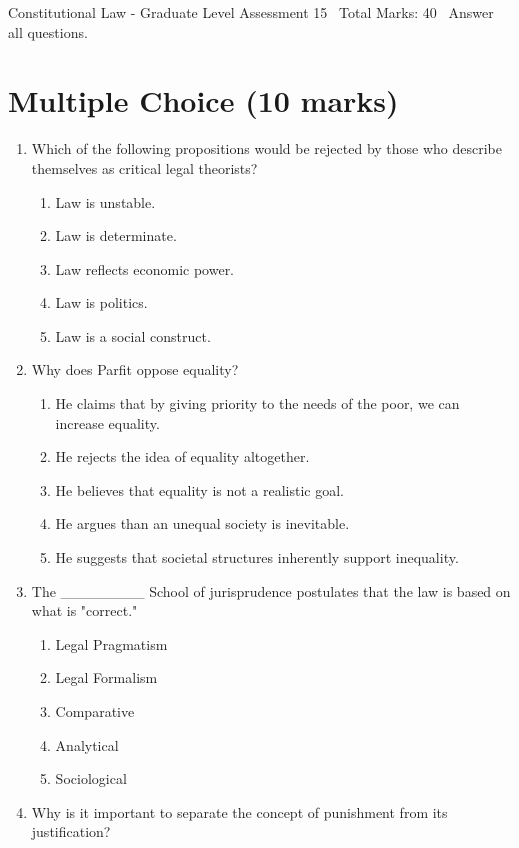 \documentclass[12pt]{article}
\begin{document}
\begin{center}
Constitutional Law - Graduate Level Assessment 15 \
Total Marks: 40 \
Answer all questions.
\end{center}

\section*{Multiple Choice (10 marks)}
\begin{enumerate}[label=\arabic*.]
\item Which of the following propositions would be rejected by those who describe themselves as critical legal theorists?
\begin{enumerate}[label=(\alph*)]
    \item Law is unstable.
    \item Law is determinate.
    \item Law reflects economic power.
    \item Law is politics.
    \item Law is a social construct.
\end{enumerate}
\item Why does Parfit oppose equality?
\begin{enumerate}[label=(\alph*)]
    \item He claims that by giving priority to the needs of the poor, we can increase equality.
    \item He rejects the idea of equality altogether.
    \item He believes that equality is not a realistic goal.
    \item He argues than an unequal society is inevitable.
    \item He suggests that societal structures inherently support inequality.
\end{enumerate}
\item The \_\_\_\_\_\_\_\_ School of jurisprudence postulates that the law is based on what is "correct."
\begin{enumerate}[label=(\alph*)]
    \item Legal Pragmatism
    \item Legal Formalism
    \item Comparative
    \item Analytical
    \item Sociological
\end{enumerate}
\item Why is it important to separate the concept of punishment from its justification?

\end{enumerate}
\end{document}
